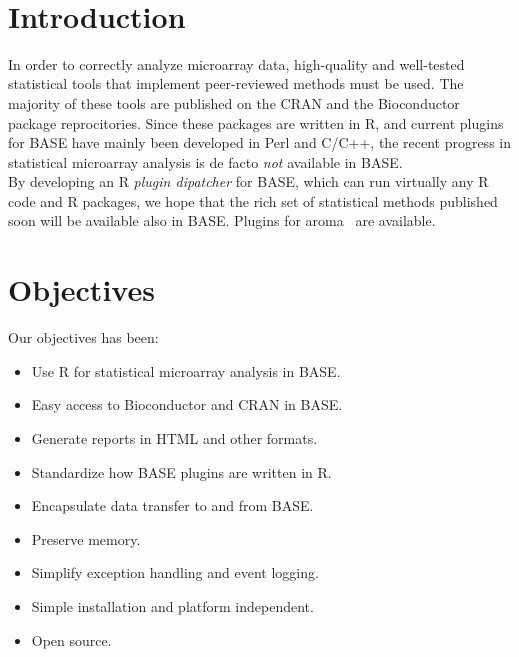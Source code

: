 \documentclass[portrait,plainsections]{sciposter}
\begin{document}
\begin{multicols}{3}                                     %
~\\[-1ex]
\begin{minipage}{\columnwidth}
\section{Introduction}
In order to correctly analyze microarray data, high-quality and well-tested
statistical tools that implement peer-reviewed methods must be used.
The majority of these tools are published on the CRAN and the Bioconductor
package reprocitories.  Since these packages are written in R, and current
plugins for BASE have mainly been developed in Perl and C/C++, the recent
 progress in statistical microarray analysis is de facto \emph{not} 
available in BASE.\\

By developing an R \emph{plugin dipatcher} for BASE, which can run
virtually any R code and R packages, we hope that the rich set of 
statistical methods published soon will be available also in BASE.
Plugins for aroma~\cite{BengtssonH_2004} are available.
\end{minipage}

\begin{minipage}{\columnwidth}
\section{Objectives}
Our objectives has been:\\[-1ex]
\begin{itemize}
 \item Use R for statistical microarray analysis in BASE.
 \item Easy access to Bioconductor and CRAN in BASE.
 \item Generate reports in HTML and other formats.
 \item Standardize how BASE plugins are written in R.
 \item Encapsulate data transfer to and from BASE.
 \item Preserve memory.
 \item Simplify exception handling and event logging.
 \item Simple installation and platform independent.
 \item Open source.
\end{itemize}
\end{minipage}



\end{multicols}
\end{document}
